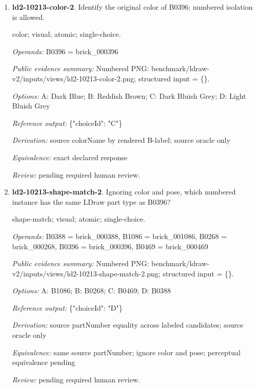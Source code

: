 \begin{enumerate}
\par{\small distance; source-data; atomic; single-choice.\par\textit{Operands:} B0762 = brick\_000762, B0957 = brick\_000957, B0706 = brick\_000706, B0713 = brick\_000713\par\textit{Public evidence summary:} \{"coordinateFrame": "Viewer world, millimeters, Euclidean distance", "centers": \{"B0957": [-4, 297.6, 23.2], "B0713": [-16.1, 237.6, 7.2], "B0706": [0, 113.452, 13.3412], "B0762": [-20, 237.6, 21.6]\}\}\par\textit{Options:} A: B0762; B: B0706; C: B0713\par\textit{Reference output:} \{"choiceId": "A"\}\par\textit{Derivation:} Euclidean norm from public rounded centers\par\textit{Equivalence:} exact declared response\par\textit{Review:} pending required human review.}
\item \textbf{ld2-10213-color-2}. Identify the original color of B0396; numbered isolation is allowed.
\par{\small color; visual; atomic; single-choice.\par\textit{Operands:} B0396 = brick\_000396\par\textit{Public evidence summary:} Numbered PNG: benchmark/ldraw-v2/inputs/views/ld2-10213-color-2.png; structured input = \{\}.\par\textit{Options:} A: Dark Blue; B: Reddish Brown; C: Dark Bluish Grey; D: Light Bluish Grey\par\textit{Reference output:} \{"choiceId": "C"\}\par\textit{Derivation:} source colorName by rendered B-label; source oracle only\par\textit{Equivalence:} exact declared response\par\textit{Review:} pending required human review.}
\item \textbf{ld2-10213-shape-match-2}. Ignoring color and pose, which numbered instance has the same LDraw part type as B0396?
\par{\small shape-match; visual; atomic; single-choice.\par\textit{Operands:} B0388 = brick\_000388, B1086 = brick\_001086, B0268 = brick\_000268, B0396 = brick\_000396, B0469 = brick\_000469\par\textit{Public evidence summary:} Numbered PNG: benchmark/ldraw-v2/inputs/views/ld2-10213-shape-match-2.png; structured input = \{\}.\par\textit{Options:} A: B1086; B: B0268; C: B0469; D: B0388\par\textit{Reference output:} \{"choiceId": "D"\}\par\textit{Derivation:} source partNumber equality across labeled candidates; source oracle only\par\textit{Equivalence:} same source partNumber; ignore color and pose; perceptual equivalence pending\par\textit{Review:} pending required human review.}

\end{enumerate}
